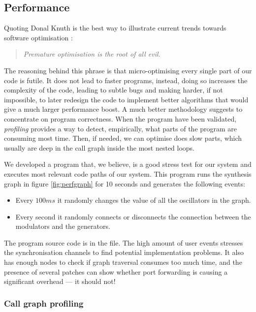 \subsection{Performance}

Quoting Donal Knuth is the best way to illustrate current trends
towards software optimisation \cite{knuth74structured}:
\begin{quote}
  \it Premature optimisation is the root of all evil.
\end{quote}

The reasoning behind this phrase is that micro-optimising every single
part of our code is futile. It does not lead to faster programs,
instead, doing so increases the complexity of the code, leading to
subtle bugs and making harder, if not impossible, to later redesign
the code to implement better algorithms that would give a much larger
performance boost. A much better methodology suggests to concentrate
on program correctness. When the program have been validated,
\emph{profiling} provides a way to detect, empirically, what parts of
the program are consuming most time. Then, if needed, we can optimise
does slow parts, which usually are deep in the call graph inside the
most nested loops.

We developed a program that, we believe, is a good stress test for our
system and executes most relevant code paths of our system. This
program runs the synthesis graph in figure \ref{fig:perfgraph} for 10
seconds and generates the following events:
\begin{itemize}
\item Every $100 ms$ it randomly changes the value of all the
  oscillators in the graph.
\item Every second it randomly connects or disconnects the connection
  between the modulators and the generators.  
\end{itemize}

The program source code is in the
 file. The high amount of user
events stresses the synchronisation channels to find potential
implementation problems. It also has enough nodes to check if graph
traversal consumes too much time, and the presence of several patches
can show whether port forwarding is causing a significant overhead ---
it should not!

\subsubsection{Call graph profiling}

